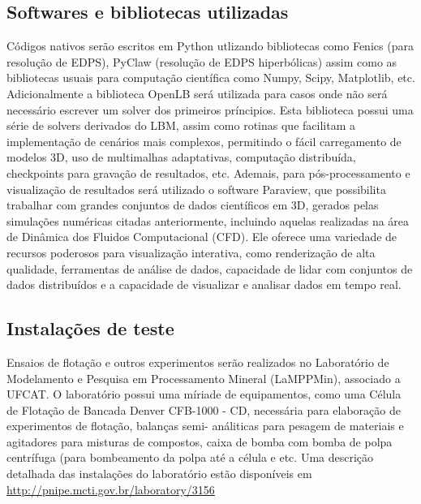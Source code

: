 \documentclass[12pt]{article}
\begin{document}
\subsection{Softwares e bibliotecas utilizadas}
Códigos nativos serão escritos em Python utlizando bibliotecas como Fenics (para resolução de EDPS)\cite{barrata2023dolfinx}, PyClaw (resolução de EDPS hiperbólicas)\cite{ketcheson2012pyclaw} assim como as bibliotecas usuais para computação científica como Numpy, Scipy, Matplotlib, etc. Adicionalmente a biblioteca OpenLB\cite{kummerlander2023openlb} será utilizada para casos onde não será necessário escrever um solver dos primeiros príncipios. Esta biblioteca possui uma série de solvers derivados do LBM, assim como rotinas que facilitam a implementação de cenários mais complexos, permitindo o fácil carregamento de modelos 3D, uso de multimalhas adaptativas, computação distribuída, checkpoints para gravação de resultados, etc.\newline
Ademais, para pós-processamento e visualização de resultados será utilizado o software Paraview\cite{ahrens200536}, que possibilita trabalhar com grandes conjuntos de dados científicos em 3D, gerados pelas simulações numéricas citadas anteriormente, incluindo aquelas realizadas na área de Dinâmica dos Fluidos Computacional (CFD). Ele oferece uma variedade de recursos poderosos para visualização interativa, como renderização de alta qualidade, ferramentas de análise de dados, capacidade de lidar com conjuntos de dados distribuídos e a capacidade de visualizar e analisar dados em tempo real.
\subsection{Instalações de teste}
Ensaios de flotação e outros experimentos serão realizados no  Laboratório de Modelamento e 
Pesquisa em Processamento Mineral (LaMPPMin), associado a UFCAT. O laboratório possui uma míriade de equipamentos, como uma Célula de Flotação de Bancada 
Denver CFB-1000 - CD, necessária para elaboração de experimentos de flotação, balanças semi-
análiticas para pesagem de materiais e agitadores para misturas de compostos, caixa de bomba com 
bomba de polpa centrífuga (para bombeamento da polpa até a célula e etc. Uma descrição detalhada 
das instalações do laboratório estão disponíveis em \href{http://pnipe.mcti.gov.br/laboratory/3156}{http://pnipe.mcti.gov.br/laboratory/3156}
\end{document}
